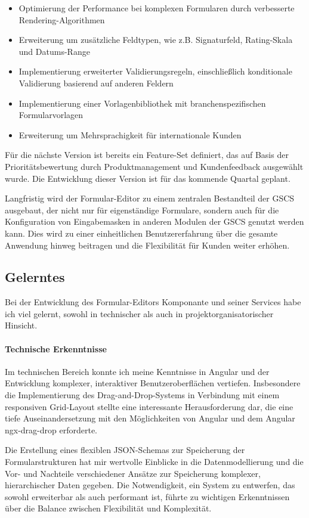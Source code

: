 \documentclass[a4paper,11pt]{article}
\begin{document}
\begin{itemize}
  \item Optimierung der Performance bei komplexen Formularen durch verbesserte Rendering-Algorithmen
  \item Erweiterung um zusätzliche Feldtypen, wie z.B. Signaturfeld, Rating-Skala und Datums-Range
  \item Implementierung erweiterter Validierungsregeln, einschließlich konditionale Validierung basierend auf anderen Feldern
  \item Implementierung einer Vorlagenbibliothek mit branchenspezifischen Formularvorlagen
  \item Erweiterung um Mehrsprachigkeit für internationale Kunden
\end{itemize}

\noindent Für die nächste Version ist bereits ein Feature-Set definiert, das auf Basis der Prioritätsbewertung durch Produktmanagement und Kundenfeedback ausgewählt wurde. Die Entwicklung dieser Version ist für das kommende Quartal geplant.

\noindent Langfristig wird der Formular-Editor zu einem zentralen Bestandteil der GSCS ausgebaut, der nicht nur für eigenständige Formulare, sondern auch für die Konfiguration von Eingabemasken in anderen Modulen der GSCS genutzt werden kann. Dies wird zu einer einheitlichen Benutzererfahrung über die gesamte Anwendung hinweg beitragen und die Flexibilität für Kunden weiter erhöhen.

\subsection{Gelerntes}
Bei der Entwicklung des Formular-Editors Komponante und seiner Services habe ich viel gelernt, sowohl in technischer als auch in projektorganisatorischer Hinsicht.

\paragraph{Technische Erkenntnisse}
Im technischen Bereich konnte ich meine Kenntnisse in Angular und der Entwicklung komplexer, interaktiver Benutzeroberflächen vertiefen. Insbesondere die Implementierung des Drag-and-Drop-Systems in Verbindung mit einem responsiven Grid-Layout stellte eine interessante Herausforderung dar, die eine tiefe Auseinandersetzung mit den Möglichkeiten von Angular und dem Angular ngx-drag-drop erforderte.

\noindent Die Erstellung eines flexiblen JSON-Schemas zur Speicherung der Formularstrukturen hat mir wertvolle Einblicke in die Datenmodellierung und die Vor- und Nachteile verschiedener Ansätze zur Speicherung komplexer, hierarchischer Daten gegeben. Die Notwendigkeit, ein System zu entwerfen, das sowohl erweiterbar als auch performant ist, führte zu wichtigen Erkenntnissen über die Balance zwischen Flexibilität und Komplexität.
\end{document}
